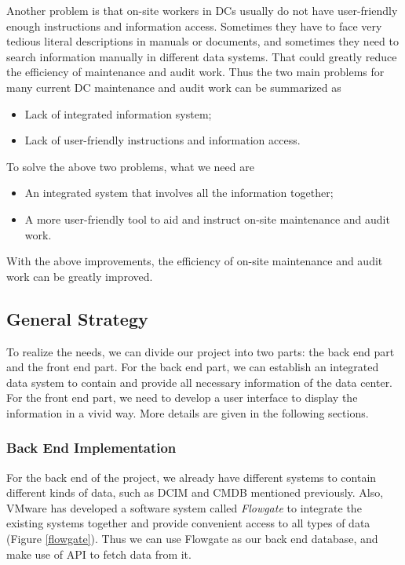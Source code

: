 \documentclass[11pt,a4paper]{article}
\begin{document}
\begin{onehalfspace}
Another problem is that on-site workers in DCs usually do not have user-friendly enough instructions and information access. Sometimes they have to face very tedious literal descriptions in manuals or documents, and sometimes they need to search information manually in different data systems. That could greatly reduce the efficiency of maintenance and audit work. Thus the two main problems for many current DC maintenance and audit work can be summarized as
\begin{itemize}
    \item Lack of integrated information system;
    \item Lack of user-friendly instructions and information access.
\end{itemize}

\noindent 
To solve the above two problems, what we need are
\begin{itemize}
    \item An integrated system that involves all the information together;

    \item  A more user-friendly tool to aid and instruct on-site maintenance and audit work.
\end{itemize}

\noindent 
With the above improvements, the efficiency of on-site maintenance and audit work can be greatly improved.

\subsection{General Strategy}
To realize the needs, we can divide our project into two parts: the back end part and the front end part. For the back end part, we can establish an integrated data system to contain and provide all necessary information of the data center. For the front end part, we need to develop a user interface to display the information in a vivid way. More details are given in the following sections.




\subsubsection{Back End Implementation}
\label{sec: flowgate}
For the back end of the project, we already have different systems to contain different kinds of data, such as DCIM and CMDB mentioned previously. Also, VMware has developed a software system called \textit{Flowgate} \cite{xjl3} to integrate the existing systems together and provide convenient access to all types of data (Figure \ref{flowgate}). Thus we can use Flowgate as our back end database, and make use of API to fetch data from it.


\end{onehalfspace}
\end{document}
